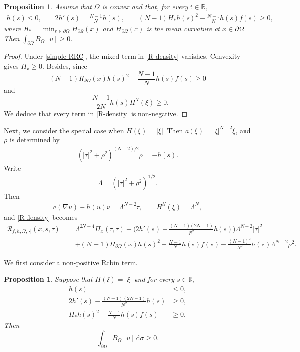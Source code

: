 \documentclass[10pt,a4paper]{amsart}
\numberwithin{equation}{section}
\newtheorem{prop}[thm]{Proposition}
\newcommand{\pa}{\partial}
\newcommand{\R}{\mathbb{R}}
\newcommand{\calR}{\mathcal{R}}
\begin{document}
\begin{prop}\label{cor:simple-RRC}
Assume that $\Omega$ is convex and that, for every $t\in\R$,
\begin{align}\label{simple-RRC}
       h(s)\le0,\qquad 2h'(s)=\frac{N-1}{N} h(s),
       \qquad (N-1)H_*h(s)^2-\frac{N-1}{N} h(s)f(s)\ge0,
\end{align}
where $H_* = \min_{x\in\partial\Omega}H_{\pa \Omega}(x)$ and $H_{\pa \Omega}(x)$ is the mean curvature at $x \in \pa \Omega$. Then $\int_{\pa \Omega} B_{\Omega}[u] \geq 0$.
\end{prop}

\begin{proof}
Under \eqref{simple-RRC}, the mixed term in \eqref{R-density} vanishes. Convexity gives $\Pi_x \ge 0$. Besides, since $$(N-1)H_{\pa \Omega}(x) h(s)^2-\frac{N-1}{N} h(s)f(s)\ge0$$ and $$-\frac{N-1}{2N}h(s)H^N(\xi)\ge0.$$ We deduce that every term in \eqref{R-density} is non-negative.
\end{proof}

Next, we consider the special case when $H(\xi)=|\xi|$. Then $a(\xi)=|\xi|^{N-2}\xi$, and $\rho$ is determined by
\begin{align}\label{rho-isotropic}
       (|\tau|^2+\rho^2)^{(N-2)/2}\rho=-h(s).
\end{align}
Write
\begin{align*}
       \Lambda=(|\tau|^2+\rho^2)^{1/2}.
\end{align*}
Then
\begin{align*}
       a(\nabla u) + h(u) \nu =\Lambda^{N-2}\tau,
       \qquad H^N (\xi)=\Lambda^N,
\end{align*}
and \eqref{R-density} becomes
\begin{align}\label{isotropic-RRC}
    \calR_{f,h,\Omega,|\cdot|}(x,s,\tau) = &\Lambda^{2N-4}\Pi_x(\tau,\tau) + \bigg(2h'(s)- \frac{(N-1)(2N-1)}{N^2} h(s)\bigg) \Lambda^{N-2} |\tau|^2\nonumber\\
    & + (N-1)H_{\pa \Omega}(x)h(s)^2- \frac{N-1}{N}h(s)f(s) - \frac{(N-1)^2}{N^2} h(s)\Lambda^{N-2}\rho^2.
\end{align}

We first consider a non-positive Robin term.
\begin{prop}\label{prop:isotropic-negative-h}
 Suppose that $H(\xi)=|\xi|$ and for every $s\in \R$,
\begin{align}\label{negative-h-conditions}
       h(s)&\le0,\nonumber\\
       2h'(s)- \frac{(N-1)(2N-1)}{N^2} h(s)&\ge0,\\
       H_*h(s)^2- \frac{N-1}{N} h(s)f(s)&\ge0.\nonumber
\end{align}
Then $$\int_{\pa \Omega} B_{\Omega}[u] \ \text{d} \sigma \geq 0.$$
\end{prop}
\end{document}

